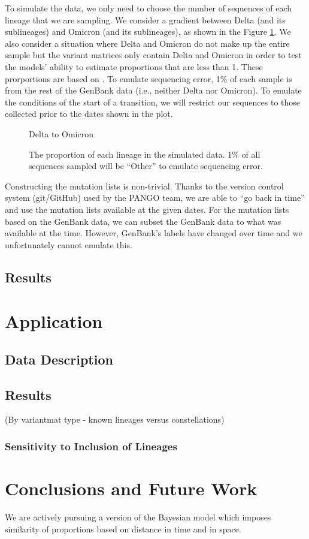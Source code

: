 \documentclass{article}
\begin{document}
To simulate the data, we only need to choose the number of sequences of each lineage that we are sampling.
We consider a gradient between Delta (and its sublineages) and Omicron (and its sublineages), as shown in the Figure \ref{deltacron}.
We also consider a situation where Delta and Omicron do not make up the entire sample but the variant matrices only contain Delta and Omicron in order to test the models' ability to estimate proportions that are less than 1.
These prorportions are based on \cite{David's invasion paper}.
To emulate sequencing error, 1\% of each sample is from the rest of the GenBank data (i.e., neither Delta nor Omicron).
To emulate the conditions of the start of a transition, we will restrict our sequences to those collected prior to the dates shown in the plot.

\begin{figure}
Delta to Omicron
\caption{\label{deltacron}The proportion of each lineage in the simulated data. 1\% of all sequences sampled will be ``Other'' to emulate sequencing error.}
\end{figure}

Constructing the mutation lists is non-trivial.
Thanks to the version control system (git/GitHub) used by the PANGO team, we are able to ``go back in time'' and use the mutation lists available at the given dates.
For the mutation lists based on the GenBank data, we can subset the GenBank data to what was available at the time.
However, GenBank's labels have changed over time and we unfortunately cannot emulate this.


\subsection{Results}



\section{Application}

\subsection{Data Description}

\subsection{Results}

(By variantmat type - known lineages versus constellations)

\subsubsection{Sensitivity to Inclusion of Lineages}

\section{Conclusions and Future Work}


We are actively pursuing a version of the Bayesian model which imposes similarity of proportions based on distance in time and in space.
\end{document}
